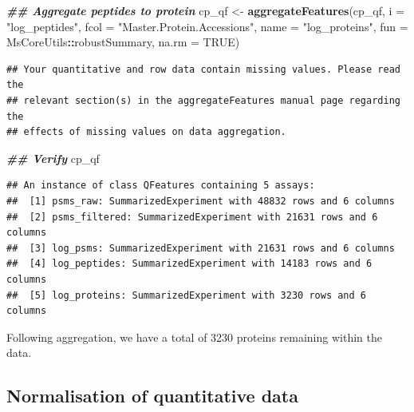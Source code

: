 \documentclass[9pt,a4paper,]{extarticle}
\newenvironment{Shaded}{\begin{snugshade}}{\end{snugshade}}
\newcommand{\AttributeTok}[1]{\textcolor[rgb]{0.13,0.29,0.53}{#1}}
\newcommand{\ConstantTok}[1]{\textcolor[rgb]{0.56,0.35,0.01}{#1}}
\newcommand{\DocumentationTok}[1]{\textcolor[rgb]{0.56,0.35,0.01}{\textbf{\textit{#1}}}}
\newcommand{\FunctionTok}[1]{\textcolor[rgb]{0.13,0.29,0.53}{\textbf{#1}}}
\newcommand{\NormalTok}[1]{#1}
\newcommand{\OtherTok}[1]{\textcolor[rgb]{0.56,0.35,0.01}{#1}}
\newcommand{\SpecialCharTok}[1]{\textcolor[rgb]{0.81,0.36,0.00}{\textbf{#1}}}
\newcommand{\StringTok}[1]{\textcolor[rgb]{0.31,0.60,0.02}{#1}}
\begin{document}
\begin{Shaded}
\begin{Highlighting}[]
\DocumentationTok{\#\# Aggregate peptides to protein}
\NormalTok{cp\_qf }\OtherTok{\textless{}{-}} \FunctionTok{aggregateFeatures}\NormalTok{(cp\_qf,}
                           \AttributeTok{i =} \StringTok{"log\_peptides"}\NormalTok{,}
                           \AttributeTok{fcol =} \StringTok{"Master.Protein.Accessions"}\NormalTok{,}
                           \AttributeTok{name =} \StringTok{"log\_proteins"}\NormalTok{,}
                           \AttributeTok{fun =}\NormalTok{ MsCoreUtils}\SpecialCharTok{::}\NormalTok{robustSummary,}
                           \AttributeTok{na.rm =} \ConstantTok{TRUE}\NormalTok{)}
\end{Highlighting}
\end{Shaded}

\begin{verbatim}
## Your quantitative and row data contain missing values. Please read the
## relevant section(s) in the aggregateFeatures manual page regarding the
## effects of missing values on data aggregation.
\end{verbatim}

\begin{Shaded}
\begin{Highlighting}[]
\DocumentationTok{\#\# Verify}
\NormalTok{cp\_qf}
\end{Highlighting}
\end{Shaded}

\begin{verbatim}
## An instance of class QFeatures containing 5 assays:
##  [1] psms_raw: SummarizedExperiment with 48832 rows and 6 columns 
##  [2] psms_filtered: SummarizedExperiment with 21631 rows and 6 columns 
##  [3] log_psms: SummarizedExperiment with 21631 rows and 6 columns 
##  [4] log_peptides: SummarizedExperiment with 14183 rows and 6 columns 
##  [5] log_proteins: SummarizedExperiment with 3230 rows and 6 columns
\end{verbatim}

Following aggregation, we have a total of 3230
proteins remaining within the data.

\subsection{Normalisation of quantitative data}\label{normalisation-of-quantitative-data}
\end{document}
